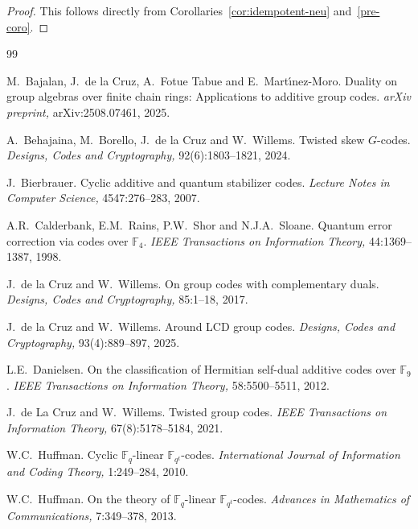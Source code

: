 \documentclass[11pt]{article}
\begin{document}
\begin{proof}
  This follows directly from Corollaries~\ref{cor:idempotent-neu} and~\ref{pre-coro}.
\end{proof}


\begin{thebibliography}{99}

 {\sc M.~Bajalan, J.~de la Cruz, A.~Fotue Tabue and E.~Mart{\'\i}nez-Moro.}
Duality on group algebras over finite chain rings: Applications to additive group codes.
\emph{arXiv preprint,}
arXiv:2508.07461, 2025.


 {\sc A.~Behajaina, M.~Borello, J.~de la Cruz and W.~Willems.}
Twisted skew $G$-codes.
\emph{Designs, Codes and Cryptography,}
92(6):1803--1821, 2024.


 {\sc J.~Bierbrauer.}
Cyclic additive and quantum stabilizer codes.
\emph{Lecture Notes in Computer Science,}
4547:276--283, 2007.

 {\sc A.R.~Calderbank, E.M.~Rains, P.W.~Shor and N.J.A.~Sloane.}
Quantum error correction via codes over $\mathbb{F}_4$.
\emph{IEEE Transactions on Information Theory,}
44:1369--1387, 1998.

 {\sc J.~de la Cruz and W.~Willems.}
On group codes with complementary duals.
\emph{Designs, Codes and Cryptography,}
85:1--18, 2017.

 {\sc J.~de la Cruz and W.~Willems.}
Around LCD group codes.
\emph{Designs, Codes and Cryptography,}
93(4):889--897, 2025.

 {\sc L.E.~Danielsen.}
On the classification of Hermitian self-dual additive codes over $\mathbb{F}_9$.
\emph{IEEE Transactions on Information Theory,}
58:5500--5511, 2012.

 {\sc J.~de La Cruz and W.~Willems.}
Twisted group codes.
\emph{IEEE Transactions on Information Theory,}
67(8):5178--5184, 2021.

 {\sc W.C.~Huffman.}
Cyclic $\mathbb{F}_q$-linear $\mathbb{F}_{q^t}$-codes.
\emph{International Journal of Information and Coding Theory,}
1:249--284, 2010.

 {\sc W.C.~Huffman.}
On the theory of $\mathbb{F}_q$-linear $\mathbb{F}_{q^t}$-codes.
\emph{Advances in Mathematics of Communications,}
7:349--378, 2013.


\end{thebibliography}
\end{document}
